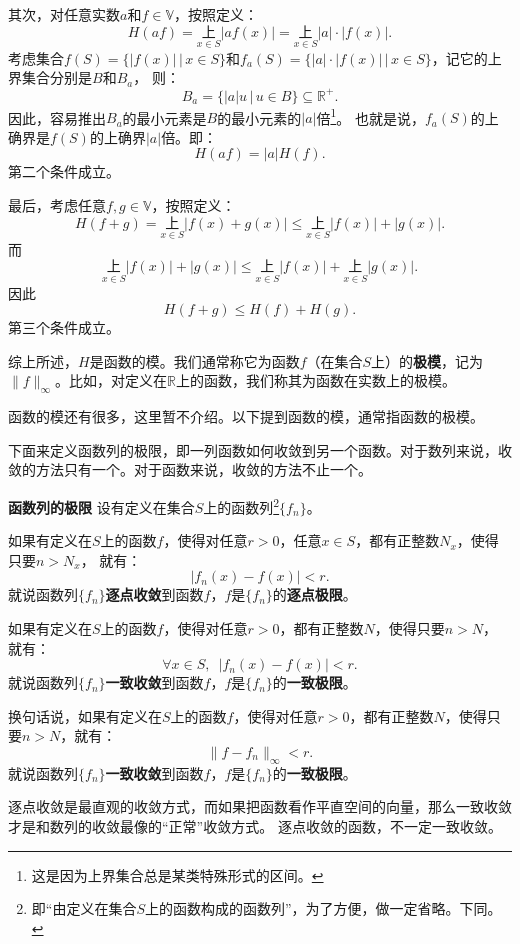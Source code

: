 \documentclass[12pt,UTF8]{ctexbook}
\begin{document}
\begin{appendix}
其次，对任意实数$a$和$f\in\mathbb{V}$，按照定义：
$$ H(af) = \underset{x\in S}{\text{上}} |af(x)| = \underset{x\in S}{\text{上}} |a|\cdot |f(x)|. $$
考虑集合$f(S) = \{ |f(x)| \, | \, x\in S\}$和$f_a(S) = \{|a|\cdot |f(x)| \, | \, x\in S\}$，记它的上界集合分别是$B$和$B_a$，
则：
$$ B_a = \{|a| u \, | \, u \in B\} \subseteq \mathbb{R}^+. $$
因此，容易推出$B_a$的最小元素是$B$的最小元素的$|a|$倍\footnote{这是因为上界集合总是某类特殊形式的区间。}。
也就是说，$f_a(S)$的上确界是$f(S)$的上确界$|a|$倍。即：
$$ H(af) = |a| H(f). $$
第二个条件成立。

最后，考虑任意$f,g \in \mathbb{V}$，按照定义：
$$ H(f + g) = \underset{x\in S}{\text{上}} |f(x) + g(x)| \leqslant \underset{x\in S}{\text{上}} |f(x)| + |g(x)|. $$
而
$$ \underset{x\in S}{\text{上}} |f(x)| + |g(x)| \leqslant \underset{x\in S}{\text{上}} |f(x)| + \underset{x\in S}{\text{上}}|g(x)|.$$
因此
$$ H(f + g) \leqslant H(f) + H(g).$$
第三个条件成立。

综上所述，$H$是函数的模。我们通常称它为函数$f$（在集合$S$上）的\textbf{极模}，记为$\|f\|_{\infty}$。比如，对定义在$\mathbb{R}$上的函数，我们称其为函数在实数上的极模。

函数的模还有很多，这里暂不介绍。以下提到函数的模，通常指函数的极模。

下面来定义函数列的极限，即一列函数如何收敛到另一个函数。对于数列来说，收敛的方法只有一个。对于函数来说，收敛的方法不止一个。

\begin{df}{\textbf{函数列的极限}}
    设有定义在集合$S$上的函数列\footnote{即“由定义在集合$S$上的函数构成的函数列”，为了方便，做一定省略。下同。}$\{f_n\}$。
    
    如果有定义在$S$上的函数$f$，使得对任意$r>0$，任意$x\in S$，都有正整数$N_x$，使得只要$n>N_x$，
    就有：
    $$ |f_n(x) - f(x) | < r.$$
    就说函数列$\{f_n\}$\textbf{逐点收敛}到函数$f$，$f$是$\{f_n\}$的\textbf{逐点极限}。

    如果有定义在$S$上的函数$f$，使得对任意$r>0$，都有正整数$N$，使得只要$n>N$，
    就有：
    $$ \forall x\in S, \,\,\,|f_n(x) - f(x) | < r.$$
    就说函数列$\{f_n\}$\textbf{一致收敛}到函数$f$，$f$是$\{f_n\}$的\textbf{一致极限}。

    换句话说，如果有定义在$S$上的函数$f$，使得对任意$r>0$，都有正整数$N$，使得只要$n>N$，就有：
    $$ \| f - f_n \|_{\infty} < r.$$
    就说函数列$\{f_n\}$\textbf{一致收敛}到函数$f$，$f$是$\{f_n\}$的\textbf{一致极限}。
\end{df}

逐点收敛是最直观的收敛方式，而如果把函数看作平直空间的向量，那么一致收敛才是和数列的收敛最像的“正常”收敛方式。
逐点收敛的函数，不一定一致收敛。


\end{appendix}
\end{document}
